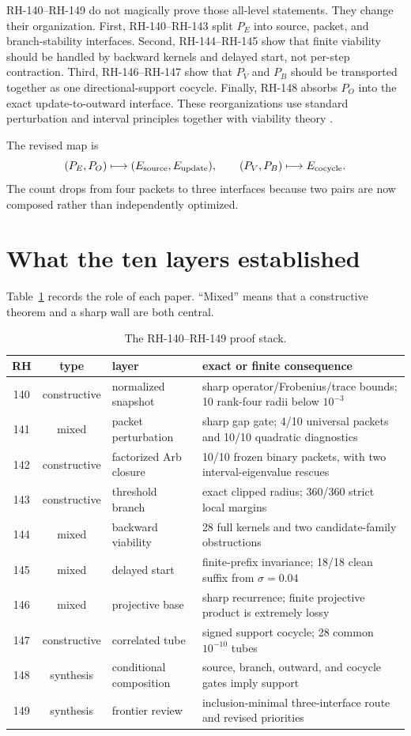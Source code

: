\documentclass[12pt]{article}
\begin{document}
RH-140--RH-149 do not magically prove those all-level statements.  They
change their organization.  First, RH-140--RH-143 split $P_E$ into source,
packet, and branch-stability interfaces.  Second, RH-144--RH-145 show that
finite viability should be handled by backward kernels and delayed start,
not per-step contraction.  Third, RH-146--RH-147 show that $P_V$ and $P_B$
should be transported together as one directional-support cocycle.  Finally,
RH-148 absorbs $P_O$ into the exact update-to-outward interface.
These reorganizations use standard perturbation and interval principles
\citep{Kato1995,Bhatia2007,Moore1966} together with viability theory
\citep{Aubin1991}.

The revised map is
\[
 (P_E,P_O)\longmapsto(E_{\rm source},E_{\rm update}),
 \qquad
 (P_V,P_B)\longmapsto E_{\rm cocycle}.
\]
The count drops from four packets to three interfaces because two pairs are
now composed rather than independently optimized.

\section{What the ten layers established}
Table~\ref{tab:layers} records the role of each paper.  ``Mixed'' means that a
constructive theorem and a sharp wall are both central.

\begin{table}[t]
\centering
\scriptsize
\renewcommand{\arraystretch}{1.12}
\begin{tabular}{cclp{6.0cm}}
\toprule
RH & type & layer & exact or finite consequence\\
\midrule
140 & constructive & normalized snapshot & sharp operator/Frobenius/trace bounds; 10 rank-four radii below $10^{-3}$\\
141 & mixed & packet perturbation & sharp gap gate; 4/10 universal packets and 10/10 quadratic diagnostics\\
142 & constructive & factorized Arb closure & 10/10 frozen binary packets, with two interval-eigenvalue rescues\\
143 & constructive & threshold branch & exact clipped radius; 360/360 strict local margins\\
144 & mixed & backward viability & 28 full kernels and two candidate-family obstructions\\
145 & mixed & delayed start & finite-prefix invariance; 18/18 clean suffix from $\sigma=0.04$\\
146 & mixed & projective base & sharp recurrence; finite projective product is extremely lossy\\
147 & constructive & correlated tube & signed support cocycle; 28 common $10^{-10}$ tubes\\
148 & synthesis & conditional composition & source, branch, outward, and cocycle gates imply support\\
149 & synthesis & frontier review & inclusion-minimal three-interface route and revised priorities\\
\bottomrule
\end{tabular}
\caption{The RH-140--RH-149 proof stack.}
\label{tab:layers}
\end{table}
\end{document}
